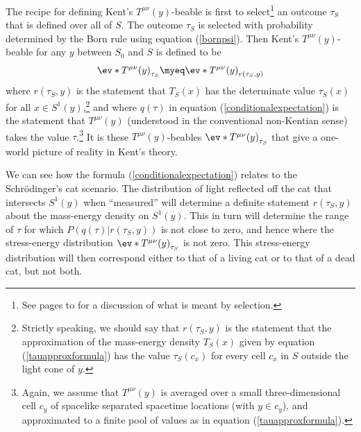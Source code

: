 \documentclass[12pt]{report}
\begin{document}
The recipe for defining Kent's $T^{\mu\nu}(y)$-beable is first to select\footnote{See pages \pageref{selectionmeaningbeg} to \pageref{selectionmeaningend} for a discussion of what is meant by selection.} an outcome $\tau_S$ that is defined over all of $S$. The outcome $\tau_S$ is selected with probability determined by the Born rule using equation (\ref{bornpsi}). Then Kent's $T^{\mu\nu}(y)$-beable for any $y$ between $S_0$ and $S$ is defined to be
\begin{equation}\label{Kentbeable} 
  \ev*{T^{\mu\nu}(y)}_{\tau_S}\myeq \ev*{T^{\mu\nu}(y)}_{r(\tau_S,y)}
\end{equation} %
%
where $r(\tau_S, y)$ is %
%
 the statement that $T_S(x)$ has the determinate value $\tau_S(x)$ for all $x\in S^1(y)$,\footnote{Strictly speaking, we should say that $r(\tau_S, y)$ is the statement that the approximation of the mass-energy density $T_S(x)$ given by equation (\ref{tauapproxformula}) has the value $\tau_S(c_x)$ for every cell $c_x$ in $S$ outside the light cone of $y$.} and where $q(\tau)$ in equation (\ref{conditionalexpectation}) is %
  the statement that $T^{\mu\nu}(y)$ (understood in the conventional non-Kentian sense) takes the value $\tau$.\footnote{\label{cyfootnote}Again, we assume that $T^{\mu\nu}(y)$ is averaged over a small three-dimensional cell $c_y$ of spacelike separated spacetime locations (with $y\in c_y$), and approximated to a finite pool of values as in equation  (\ref{tauapproxformula}).} It is these $T^{\mu\nu}(y)$-beables $\ev*{T^{\mu\nu}(y)}_{\tau_S}$ that give a one-world picture of reality in Kent's theory. 

We can see how the formula (\ref{conditionalexpectation}) relates to the Schr\"{o}dinger's cat scenario. The distribution of light reflected off the cat that intersects $S^1(y)$ when ``measured'' will determine a definite statement $r(\tau_S, y)$ about the mass-energy density on $S^1(y)$. This in turn will determine the range of $\tau$ for which $P(q(\tau)|r(\tau_S,y))$ is not close to zero, and hence where the stress-energy distribution $\ev*{T^{\mu\nu}(y)}_{\tau_S}$ is not zero. This stress-energy distribution will then correspond either to that of  a living cat or to that of a dead cat, but not both.  
\end{document}
